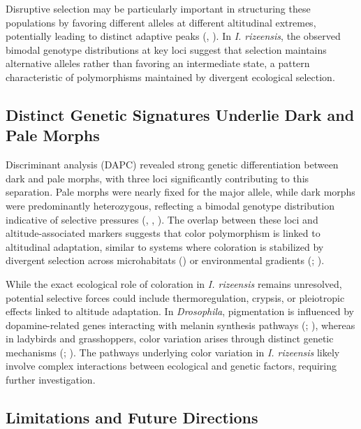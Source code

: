 \documentclass[9pt,a4paper,twoside]{rho-class/rho}
\begin{document}
    Disruptive selection may be particularly important in structuring these populations by favoring different alleles at different altitudinal extremes, potentially leading to distinct adaptive peaks (\cite{Berdahl2015}, \cite{Forester2016}). In \textit{I. rizeensis}, the observed bimodal genotype distributions at key loci suggest that selection maintains alternative alleles rather than favoring an intermediate state, a pattern characteristic of polymorphisms maintained by divergent ecological selection.

    \subsection{Distinct Genetic Signatures Underlie Dark and Pale Morphs}

    Discriminant analysis (DAPC) revealed strong genetic differentiation between dark and pale morphs, with three loci significantly contributing to this separation. Pale morphs were nearly fixed for the major allele, while dark morphs were predominantly heterozygous, reflecting a bimodal genotype distribution indicative of selective pressures (\cite{Prince2017}, \cite{Thompson2019}, \cite{PereiraMartins2022}). The overlap between these loci and altitude-associated markers suggests that color polymorphism is linked to altitudinal adaptation, similar to systems where coloration is stabilized by divergent selection across microhabitats (\cite{Villoutreix2023}) or environmental gradients (\cite{Mullen2008}; \cite{Wittkopp2003}).

    While the exact ecological role of coloration in \textit{I. rizeensis} remains unresolved, potential selective forces could include thermoregulation, crypsis, or pleiotropic effects linked to altitude adaptation. In \textit{Drosophila}, pigmentation is influenced by dopamine-related genes interacting with melanin synthesis pathways (\cite{Wright1987}; \cite{Wittkopp2003}), whereas in ladybirds and grasshoppers, color variation arises through distinct genetic mechanisms (\cite{MICHIE2010}; \cite{Bastide2016}). The pathways underlying color variation in \textit{I. rizeensis} likely involve complex interactions between ecological and genetic factors, requiring further investigation.

    \subsection{Limitations and Future Directions}
\end{document}
